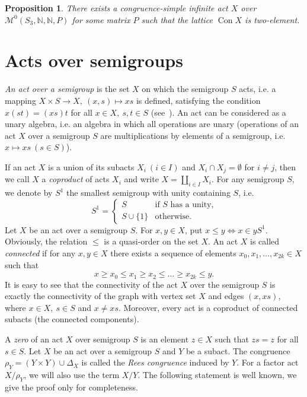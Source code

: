 \documentclass{birkau}
\numberwithin{equation}{section}
\theoremstyle{plain}
\newtheorem{proposition}[theorem]{Proposition}
\theoremstyle{definition}
\DeclareMathOperator{\Con}{Con}
\begin{document}
	\begin{proposition} \label{pr2.1}
	    There exists a congruence-simple infinite act $X$ over \newline $\mathcal{M}^0(S_3,\mathbb{N},\mathbb{N},P) $ for some matrix $P$ such that the lattice $\Con X$ is two-element.
	\end{proposition}

\section{Acts over semigroups}	

	\textit{An act over a semigroup} is the set $X$ on which the semigroup $S$ acts, i.e. a mapping $ X \times S \rightarrow X,\ (x,s) \mapsto xs $ is defined, satisfying the condition $ x(st)=(xs)t $ for all $x\in X,\ s,t\in S$ (see~\cite{kilp}). An act can be considered as a unary algebra, i.e. an algebra in which all operations are unary (operations of an act $X$ over a semigroup $S$ are multiplications by elements of a semigroup, i.e. $ x \mapsto xs \ (s\in S) $).
	
	If an act $X$ is a union of its subacts $ X_i\ (i \in I) $ and $ X_i \cap X_j = \emptyset $ for $i \neq j$, then we call $X$ a \textit{coproduct} of acts $X_i$ and write $ X = \coprod_{i\in I} X_i $. For any semigroup $S$, we denote by $S^1$ the smallest semigroup with unity containing $S$, i.e.
	$$ S^1 =
		\begin{cases}
			S & \text{if $S$ has a unity,}\\
			S \cup \{1\} & \text{otherwise.}
		\end{cases}
	$$
	Let $X$ be an act over a semigroup $S$. For $ x,y \in X$, put $ x \leqslant y \Leftrightarrow x \in yS^1 $. Obviously, the relation $\leqslant$ is a quasi-order on the set $X$. An act $X$ is called \textit{connected} if for any $x,y\in X$ there exists a sequence of elements $x_0,x_1,\ldots,x_{2k}\in X$ such that $$ x \geqslant x_0 \leqslant x_1 \geqslant x_2 \leqslant \ldots \geqslant x_{2k} \leqslant y. $$ It is easy to see that the connectivity of the act $X$ over the semigroup $S$ is exactly the connectivity of the graph with vertex set $X$ and edges $ (x,xs) $, where $ x \in X,\ s \in S $ and $x \neq xs$. Moreover, every act is a coproduct of connected subacts (the connected components).
	
	A \textit{zero} of an act $X$ over semigroup $S$ is an element $z \in X$ such that $zs=z$ for all $s \in S$.
	Let $X$ be an act over a semigroup $S$ and $Y$ be a subact. The congruence $\rho_Y = (Y \times Y) \cup \Delta_X$ is called the \textit{Rees congruence} induced by $Y$. For a factor act ${X}/{\rho_Y}$, we will also use the term $X/Y$. The following statement is well known, we give the proof only for completeness.
	
\end{document}
